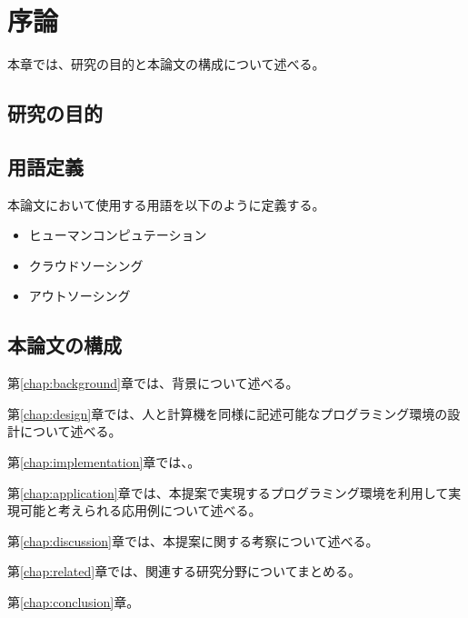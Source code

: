 \chapter{序論}
\label{chap:introduction}

本章では、研究の目的と本論文の構成について述べる。

\section{研究の目的}\label{ux7814ux7a76ux306eux76eeux7684}

\section{用語定義}\label{ux7528ux8a9eux5b9aux7fa9}

本論文において使用する用語を以下のように定義する。

\begin{itemize}
\itemsep1pt\parskip0pt
\item
  ヒューマンコンピュテーション
\item
  クラウドソーシング
\item
  アウトソーシング
\end{itemize}

\section{本論文の構成}\label{ux672cux8ad6ux6587ux306eux69cbux6210}

第\ref{chap:background}章では、背景について述べる。

第\ref{chap:design}章では、人と計算機を同様に記述可能なプログラミング環境の設計について述べる。

第\ref{chap:implementation}章では、。

第\ref{chap:application}章では、本提案で実現するプログラミング環境を利用して実現可能と考えられる応用例について述べる。

第\ref{chap:discussion}章では、本提案に関する考察について述べる。

第\ref{chap:related}章では、関連する研究分野についてまとめる。

第\ref{chap:conclusion}章。
